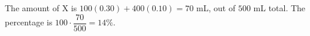 The amount of X is $100(0.30)+400(0.10)=70$ mL, out of $500$ mL total. The percentage is $100\cdot\dfrac{70}{500}=\boxed{14\%}$.

